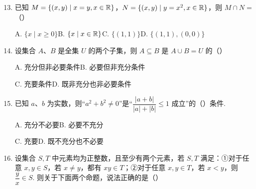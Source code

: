 \documentclass[a4paper,11pt]{article}
\begin{document}
\begin{enumerate}
\setcounter{enumi}{12}

\item 已知 $M=\{(x,y)\mid x=y,x\in\mathbb{R}\}$，$N=\{(x,y)\mid y=x^2,x\in\mathbb{R}\}$，则 $M\cap N=$\mbox{（\quad）}

\keepwithprev
A. $\{x\mid x\geqslant0\}$\qquad B. $\{x\mid x\in\mathbb{R}\}$\qquad C. $\{(1,1)\}$\qquad D. $\{(1,1),(0,0)\}$

\ifanswer
\solbegin
{}
\solend
\fi

\item 设集合 $A$、$B$ 是全集 $U$ 的两个子集，则 $A\subseteq B$ 是 $A\cup B=U$ 的\mbox{（\quad）}

\keepwithprev
A. 充分但非必要条件\qquad B. 必要但非充分条件

C. 充要条件\qquad D. 既非充分也非必要条件

\ifanswer
\solbegin
{}
\solend
\fi

\item 已知 $a$、$b$ 为实数，则“$a^2+b^2\neq0$”是“$\dfrac{|a+b|}{|a|+|b|}\leqslant1$ 成立”的\mbox{（\quad）}条件.

\keepwithprev
A. 充分不必要\qquad B. 必要不充分

C. 充要\qquad D. 既不充分也不必要

\ifanswer
\solbegin
{}
\solend
\fi

\item 设集合 $S,T$ 中元素均为正整数，且至少有两个元素，若 $S,T$ 满足：①对于任意 $x,y\in S$，若 $x\neq y$，都有 $xy\in T$；②对于任意 $x,y\in T$，若 $x<y$，则 $\dfrac yx\in S$. 则关于下面两个命题，说法正确的是\mbox{（\quad）}


\end{enumerate}
\end{document}
